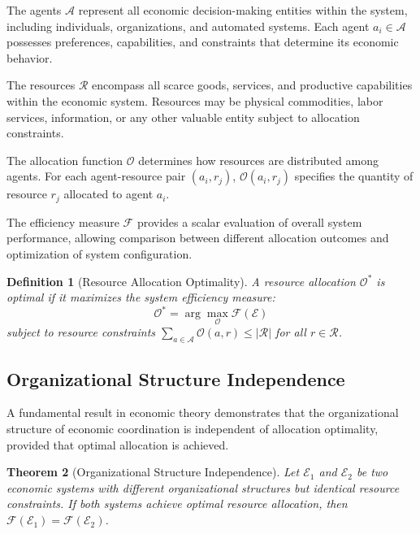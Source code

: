 \documentclass[12pt,a4paper]{article}
\newtheorem{theorem}{Theorem}
\newtheorem{definition}[theorem]{Definition}
\begin{document}
The agents $\mathcal{A}$ represent all economic decision-making entities within the system, including individuals, organizations, and automated systems. Each agent $a_i \in \mathcal{A}$ possesses preferences, capabilities, and constraints that determine its economic behavior.

The resources $\mathcal{R}$ encompass all scarce goods, services, and productive capabilities within the economic system. Resources may be physical commodities, labor services, information, or any other valuable entity subject to allocation constraints.

The allocation function $\mathcal{O}$ determines how resources are distributed among agents. For each agent-resource pair $(a_i, r_j)$, $\mathcal{O}(a_i, r_j)$ specifies the quantity of resource $r_j$ allocated to agent $a_i$.

The efficiency measure $\mathcal{F}$ provides a scalar evaluation of overall system performance, allowing comparison between different allocation outcomes and optimization of system configuration.

\begin{definition}[Resource Allocation Optimality]
A resource allocation $\mathcal{O}^*$ is optimal if it maximizes the system efficiency measure:
\begin{equation}
\mathcal{O}^* = \arg\max_{\mathcal{O}} \mathcal{F}(\mathcal{E})
\end{equation}
subject to resource constraints $\sum_{a \in \mathcal{A}} \mathcal{O}(a,r) \leq |\mathcal{R}|$ for all $r \in \mathcal{R}$.
\end{definition}

\subsection{Organizational Structure Independence}

A fundamental result in economic theory demonstrates that the organizational structure of economic coordination is independent of allocation optimality, provided that optimal allocation is achieved.

\begin{theorem}[Organizational Structure Independence]
Let $\mathcal{E}_1$ and $\mathcal{E}_2$ be two economic systems with different organizational structures but identical resource constraints. If both systems achieve optimal resource allocation, then $\mathcal{F}(\mathcal{E}_1) = \mathcal{F}(\mathcal{E}_2)$.
\end{theorem}
\end{document}
